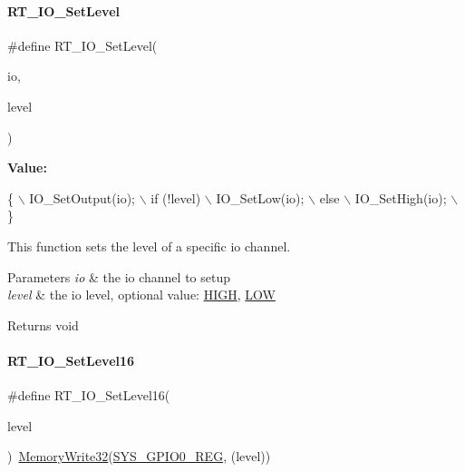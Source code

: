 \paragraph{\texorpdfstring{R\+T\+\_\+\+I\+O\+\_\+\+Set\+Level}{RT\_IO\_SetLevel}}
{\footnotesize\ttfamily \#define R\+T\+\_\+\+I\+O\+\_\+\+Set\+Level(\begin{DoxyParamCaption}\item[{}]{io,  }\item[{}]{level }\end{DoxyParamCaption})}

{\bfseries Value\+:}
\begin{DoxyCode}
\{                       \(\backslash\)
        IO\_SetOutput(io);   \(\backslash\)
        if (!level)         \(\backslash\)
            IO\_SetLow(io);  \(\backslash\)
        else                \(\backslash\)
            IO\_SetHigh(io); \(\backslash\)
    \}
\end{DoxyCode}


This function sets the level of a specific io channel. 


\begin{DoxyParams}{Parameters}
{\em io} & the io channel to setup \\
\hline
{\em level} & the io level, optional value\+: \mbox{\hyperlink{a00014_a5bb885982ff66a2e0a0a45a8ee9c35e2}{H\+I\+GH}}, \mbox{\hyperlink{a00014_ab811d8c6ff3a505312d3276590444289}{L\+OW}} \\
\hline
\end{DoxyParams}
\begin{DoxyReturn}{Returns}
void 
\end{DoxyReturn}
\mbox{\label{a00014_a5a3ae496ca3e12098c74c9f13b20c554}} 
\paragraph{\texorpdfstring{R\+T\+\_\+\+I\+O\+\_\+\+Set\+Level16}{RT\_IO\_SetLevel16}}
{\footnotesize\ttfamily \#define R\+T\+\_\+\+I\+O\+\_\+\+Set\+Level16(\begin{DoxyParamCaption}\item[{}]{level }\end{DoxyParamCaption})~\mbox{\hyperlink{a00020_ad9953f631a539cfaa35baf94f878b3ec}{Memory\+Write32}}(\mbox{\hyperlink{a00020_adadaa0ab1ebbd7ba9b70dfd24c3ed44dabc4ad11c216d218134b37833679bab11}{S\+Y\+S\+\_\+\+G\+P\+I\+O0\+\_\+\+R\+EG}}, (level))}



